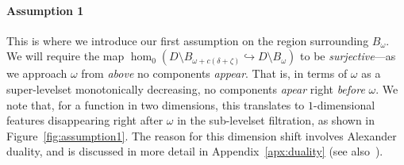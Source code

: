 \paragraph{Assumption 1}

This is where we introduce our first assumption on the region surrounding $B_\omega$.
We will require the map $\hom_0(D\setminus B_{\omega+c(\delta+\zeta)}\hookrightarrow D\setminus B_\omega)$ to be \emph{surjective}---as we approach $\omega$ from \emph{above} no components \emph{appear}.
That is, in terms of $\omega$ as a super-levelset monotonically decreasing, no components \emph{apear} right \emph{before} $\omega$.
We note that, for a function in two dimensions, this translates to $1$-dimensional features disappearing right after $\omega$ in the sub-levelset filtration, as shown in Figure~\ref{fig:assumption1}.
The reason for this dimension shift involves Alexander duality, and is discussed in more detail in Appendix~\ref{apx:duality} (see also~\cite{edelsbrunner12alexander}).

